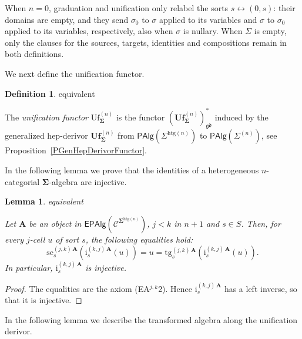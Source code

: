 \documentclass[a4paper, reqno]{amsbook}
\makeatletter
\newcommand{\sig}[1]{\mathbf{#1}}             %
\newcommand{\spec}[1]{\boldsymbol{\mathcal{#1}}} %
\newcommand{\gd}{\mathfrak{gd}}              %
\newcommand{\htg}{\mathrm{htg}}                %
\newcommand{\src}{\mathrm{sc}}
\newcommand{\tgt}{\mathrm{tg}}
\newcommand{\Uf}{\mathrm{Uf}}
\newcommand{\bUf}{\mathbf{Uf}}
\theoremstyle{plain}
\newtheorem{lemma}[theorem]{Lemma}
\theoremstyle{definition}
\newtheorem{definition}[theorem]{Definition}
\newcommand*{\CA@leanpending}{}
\newcommand*{\CA@leanrelation}{}
\newcommand*{\lean}[2]{%
  \ifcsname\string\color@lean@#1\endcsname\else
    \PackageError{main}{Unknown relation `#1' in \string\lean}{Use equivalent, weaker or stronger.}%
  \fi
  \gdef\CA@leanrelation{#1}%
  \gdef\CA@leanpending{#2}}
\makeatother
\begin{document}
When $n=0$, graduation and unification only relabel the sorts $s\leftrightarrow(0,s)$: their domains are empty, and they send $\sigma_0$ to $\sigma$ applied to its variables and $\sigma$ to $\sigma_0$ applied to its variables, respectively, also when $\sigma$ is nullary.
When $\Sigma$ is empty, only the clauses for the sources, targets, identities and compositions remain in both definitions.

We next define the unification functor.

\begin{definition}\label{DUfFunctor}\lean{equivalent}{Presentations.unificationPartialFunctor}
The \emph{unification functor} $\Uf^{(n)}_{\sig{\Sigma}}$ is the functor $(\bUf^{(n)}_{\sig{\Sigma}})^{\ast}_{\gd}$ induced by the generalized hep-derivor $\bUf^{(n)}_{\sig{\Sigma}}$ from $\mathsf{PAlg}(\Sigma^{\htg(n)})$ to $\mathsf{PAlg}(\Sigma^{(n)})$, see Proposition~\ref{PGenHepDerivorFunctor}.
\end{definition}

In the following lemma we prove that the identities of a heterogeneous $n$-categorial $\sig{\Sigma}$-algebra are injective.

\begin{lemma}\label{LUfIdInj}\lean{equivalent}{Presentations.identity_injective}
Let $\mathbf{A}$ be an object in $\mathsf{EPAlg}(\spec{C}^{\sig{\Sigma}^{\htg(n)}})$, $j<k$ in $n+1$ and $s\in S$.
Then, for every $j$-cell $u$ of sort $s$, the following equalities hold:
$$
\src^{(j,k)\,\mathbf{A}}_{s}\left(\mathrm{i}^{(k,j)\,\mathbf{A}}_{s}(u)\right)=u=\tgt^{(j,k)\,\mathbf{A}}_{s}\left(\mathrm{i}^{(k,j)\,\mathbf{A}}_{s}(u)\right).
$$
In particular, $\mathrm{i}^{(k,j)\,\mathbf{A}}_{s}$ is injective.
\end{lemma}
\begin{proof}
The equalities are the axiom (EA$^{j,k}$2).
Hence $\mathrm{i}^{(k,j)\,\mathbf{A}}_{s}$ has a left inverse, so that it is injective.
\end{proof}

In the following lemma we describe the transformed algebra along the unification derivor.
\end{document}
